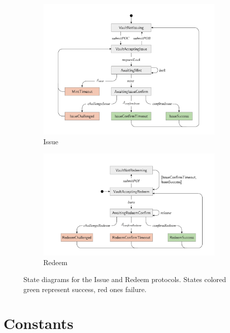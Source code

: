 \begin{figure}
\begin{subfigure}{\textwidth}
  \centering
  \includegraphics[width=\linewidth]{img/issue.png}
  \caption{Issue}
\end{subfigure}
\begin{subfigure}{\textwidth}
  \centering
  \includegraphics[width=\linewidth]{img/redeem.png}
  \caption{Redeem}
\end{subfigure}
\caption[State diagrams for the Issue and Redeem protocols]{State diagrams for the Issue and Redeem protocols. States colored green represent success, red ones failure.}
\label{fig:state_diagrams}
\end{figure}


\section{Constants}
\label{sec:constants}

